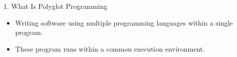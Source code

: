 \begin{roundedbeamerblock}{1. What Is Polyglot Programming}
    \baselineskip 50pt
    \vspace{5mm}
    \begin{itemize}
        \item Writing software using multiple programming languages within a single program.
    \vspace{4mm}
        \item These program runs within a common execution environment.
    \vspace{5mm}
    \end{itemize}

\end{roundedbeamerblock}
